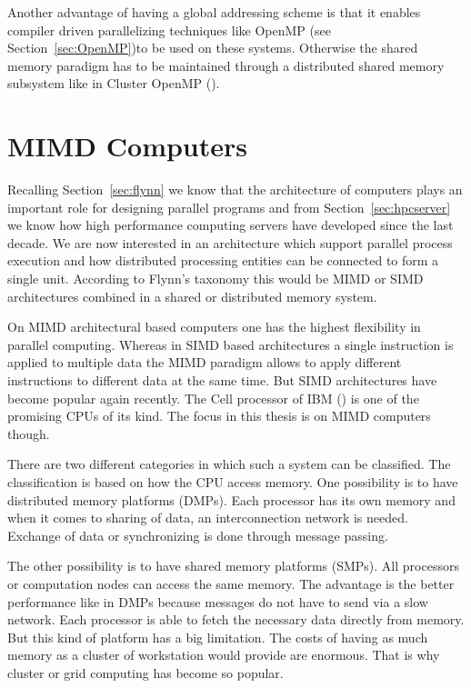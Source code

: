 Another advantage of having a global addressing scheme is that it
enables compiler driven parallelizing techniques like OpenMP (see
Section~\ref{sec:OpenMP})to be used on these systems. Otherwise the
shared memory paradigm has to be maintained through a distributed
shared memory subsystem like in Cluster OpenMP
(\cite{hoeflinger06clusterOpenMP}).

\section{MIMD Computers}
\label{sec:mimd_computers}

Recalling Section~\ref{sec:flynn} we know that the architecture of
computers plays an important role for designing parallel programs and from 
Section~\ref{sec:hpcserver} we know how high performance computing
servers have developed since the last decade. We are now
interested in an architecture which support parallel process execution
and how distributed processing entities can be connected to
form a single unit. According to Flynn's taxonomy this would be MIMD
or SIMD architectures combined in a shared or distributed memory system.


On MIMD architectural based computers one has the highest flexibility
in parallel computing. Whereas in SIMD based architectures a single
instruction is applied to multiple data the MIMD paradigm allows to
apply different instructions to different data at the same time. But
SIMD architectures have become popular again recently. The Cell
processor of IBM (\cite{kahle05cell}) is one of the promising CPUs of
its kind. The focus in 
this thesis is on MIMD computers though.


There are two different categories in which such a system can be
classified. The classification is based on how the CPU access
memory. One possibility is to have distributed memory platforms (DMPs). Each
processor has its own memory and when it comes to sharing of data, an
interconnection network is needed. Exchange of data or synchronizing
is done through message passing.

The other possibility is to have shared memory platforms (SMPs). All
processors or computation nodes can access the same memory. The
advantage is the better performance like in DMPs because messages do not
have to send via a slow network. Each processor is able to
fetch the necessary data directly from memory. But this kind of platform
has a big limitation. The costs of having as much memory as a cluster
of workstation would provide are enormous. That is why cluster or
grid computing has become so popular.

